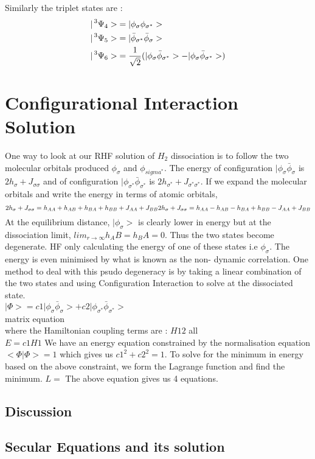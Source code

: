 \documentclass[11pt]{article}   	%
\begin{document}
	Similarly the triplet states are :\\
	\begin{equation}
	\begin{split}
		|\prescript{3}{}{\Psi_4}>&=|\phi_{\sigma}\phi_{\sigma^*}>\\
		|\prescript{3}{}{\Psi_5}>&=|\bar{\phi}_{\sigma^*}\bar{\phi}_{\sigma}>\\
		|\prescript{3}{}{\Psi_6}>&=\frac{1}{\sqrt{2}}(|\phi_{\sigma}\bar{\phi}_{\sigma^*}>-
		|\phi_{\sigma}\bar{\phi}_{\sigma^*}>)\\
	\end{split}
	\end{equation}
\section{Configurational Interaction Solution}
	One way to look at our RHF solution of $H_2$ dissociation is to follow the two molecular orbitals produced $\phi_{\sigma}$ and $\phi_{sigma^*}$. 
	The energy of configuration $|\phi_{\sigma} \bar{\phi}_{\sigma}$ is $2h_{\sigma} +J_{\sigma \sigma}$ and of configuration $|\phi_{\sigma^*} \bar{\phi}_{\sigma^*}$ is $2h_{\sigma^*} +J_{\sigma^* \sigma^*}$. If we expand the molecular orbitals and write the energy in terms of atomic orbitals, \\
	\begin{equation}
	2h_{\sigma} +J_{\sigma \sigma}=h_{AA}+h_{AB}+h_{BA}+h_{BB}+J_{AA}+J_{BB}\\
	2h_{\sigma} +J_{\sigma \sigma}=h_{AA}-h_{AB}-h_{BA}+h_{BB}-J_{AA}+J_{BB}\\
	\end{equation}
	At the equilibrium distance, $|\phi_{\sigma}>$ is clearly lower in energy but at the dissociation limit, $lim_{r\rightarrow\infty} h_AB=h_BA=0$. Thus the two states
	become degenerate. HF only calculating the energy of one of these states i.e $\phi_{\sigma}$. The energy is even minimised by what is known as the non-
	dynamic correlation. One method to deal with this psudo degeneracy is by taking a linear combination of the two states and using Configuration Interaction 
	to solve at the dissociated state. \\
	$|\Phi>=c1 |\phi_{\sigma}\bar{\phi}_{\sigma}>+c2|\phi_{\sigma^*}\bar{\phi}_{\sigma^*}>$\\
	matrix equation\\
	where the Hamiltonian coupling terms are :
	$H12$ all \\
	$E=c1H1$
	We have an energy equation constrained by the normalisation equation $<\Phi|\Phi>=1$ which gives us $c1^2+c2^2=1$.
	To solve for the minimum in energy based on the above constraint, we form the Lagrange function and find the minimum. 
	$L=$
	The above equation gives us 4 equations.
	\subsection{Discussion}
	\subsection{Secular Equations and its solution}
\end{document}
